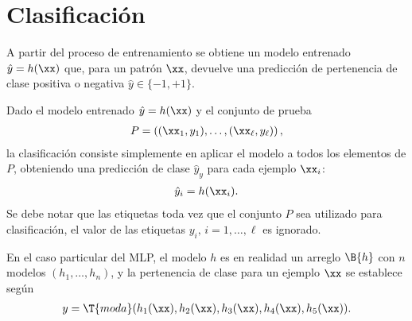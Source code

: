 %
%
%
\section{Clasificación}
%
A partir del proceso de entrenamiento se obtiene un modelo entrenado
$\hat{y} = h(\xx)$ que, para un patrón $\xx$, devuelve una predicción
de pertenencia de clase positiva o negativa $\hat{y}\in\{-1,+1\}$.

Dado el modelo entrenado $\hat{y} = h(\xx)$ y el conjunto de prueba
%
\begin{align*}
  P = \left( (\xx_1,y_1),\ldots,(\xx_\ell,y_\ell) \right),
\end{align*}
%
la clasificación consiste simplemente en aplicar el modelo a todos los
elementos de $P$, obteniendo una predicción de clase $\hat{y}_y$
para cada ejemplo $\xx_i$:
%
\begin{align*}
  \hat{y}_i = h(\xx_i).
\end{align*}
%
Se debe notar que las etiquetas toda vez que el conjunto $P$ sea
utilizado para clasificación, el valor de las etiquetas
$y_i,\,i=1,\ldots,\ell$ es ignorado.

En el caso particular del MLP, el modelo $h$ es en realidad un arreglo
$\B{h}$ con $n$ modelos $(h_1,\ldots,h_n)$, y la pertenencia de clase
para un ejemplo $\xx$ se establece según
%
\begin{align}
  y = \T{moda}( h_1(\xx), h_2(\xx), h_3(\xx), h_4(\xx), h_5(\xx)).
\end{align}
%
